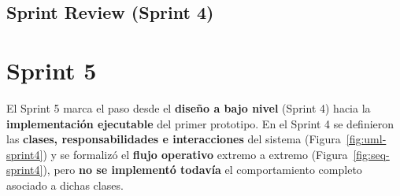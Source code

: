 \documentclass{report}
\begin{document}
\subsection{Sprint Review (Sprint 4)}


\section{Sprint 5}
\label{sect:Sp5}


El Sprint 5 marca el paso desde el \textbf{diseño a bajo nivel} (Sprint 4) hacia la \textbf{implementación ejecutable} del primer prototipo. En el Sprint 4 se definieron las \textbf{clases, responsabilidades e interacciones} del sistema (Figura~\ref{fig:uml-sprint4}) y se formalizó el \textbf{flujo operativo} extremo a extremo (Figura~\ref{fig:seq-sprint4}), pero \textbf{no se implementó todavía} el comportamiento completo asociado a dichas clases.
\end{document}
